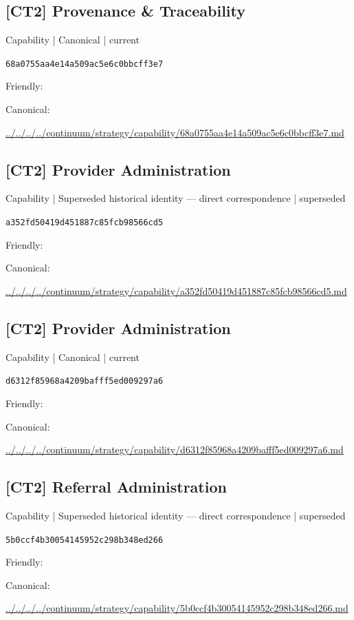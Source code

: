 \documentclass[10pt,a4paper]{article}
\begin{document}
\subsection*{[CT2] Provenance \& Traceability}
{\small Capability | Canonical | current}\par
\texttt{68a0755aa4e14a509ac5e6c0bbcff3e7}\par
Friendly: \par
Canonical: \par
{\footnotesize\url{../../../../continuum/strategy/capability/68a0755aa4e14a509ac5e6c0bbcff3e7.md}}\par
\subsection*{[CT2] Provider Administration}
{\small Capability | Superseded historical identity — direct correspondence | superseded}\par
\texttt{a352fd50419d451887c85fcb98566cd5}\par
Friendly: \par
Canonical: \par
{\footnotesize\url{../../../../continuum/strategy/capability/a352fd50419d451887c85fcb98566cd5.md}}\par
\subsection*{[CT2] Provider Administration}
{\small Capability | Canonical | current}\par
\texttt{d6312f85968a4209bafff5ed009297a6}\par
Friendly: \par
Canonical: \par
{\footnotesize\url{../../../../continuum/strategy/capability/d6312f85968a4209bafff5ed009297a6.md}}\par
\subsection*{[CT2] Referral Administration}
{\small Capability | Superseded historical identity — direct correspondence | superseded}\par
\texttt{5b0ccf4b30054145952c298b348ed266}\par
Friendly: \par
Canonical: \par
{\footnotesize\url{../../../../continuum/strategy/capability/5b0ccf4b30054145952c298b348ed266.md}}\par
\end{document}
